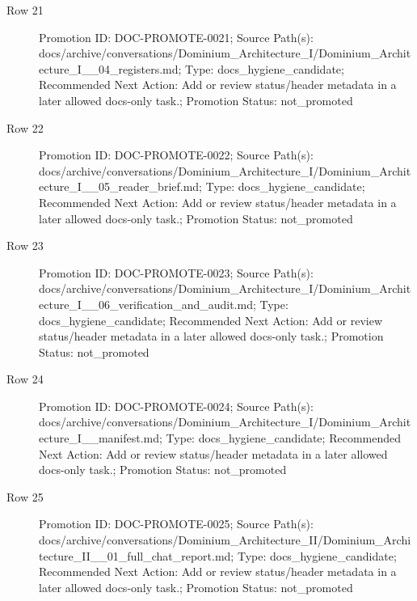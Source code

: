 \documentclass[10.5pt,a4paper,openany]{book}
\begin{document}
\begin{description}
\item[Row 21] Promotion ID: DOC-\allowbreak{}PROMOTE-\allowbreak{}0021; Source Path(s): docs/\allowbreak{}archive/\allowbreak{}conversations/\allowbreak{}Dominium\_\allowbreak{}Architecture\_\allowbreak{}I/\allowbreak{}Dominium\_\allowbreak{}Architecture\_\allowbreak{}I\_\allowbreak{}\_\allowbreak{}04\_\allowbreak{}registers.\allowbreak{}md; Type: docs\_\allowbreak{}hygiene\_\allowbreak{}candidate; Recommended Next Action: Add or review status/\allowbreak{}header metadata in a later allowed docs-\allowbreak{}only task.\allowbreak{}; Promotion Status: not\_\allowbreak{}promoted
\item[Row 22] Promotion ID: DOC-\allowbreak{}PROMOTE-\allowbreak{}0022; Source Path(s): docs/\allowbreak{}archive/\allowbreak{}conversations/\allowbreak{}Dominium\_\allowbreak{}Architecture\_\allowbreak{}I/\allowbreak{}Dominium\_\allowbreak{}Architecture\_\allowbreak{}I\_\allowbreak{}\_\allowbreak{}05\_\allowbreak{}reader\_\allowbreak{}brief.\allowbreak{}md; Type: docs\_\allowbreak{}hygiene\_\allowbreak{}candidate; Recommended Next Action: Add or review status/\allowbreak{}header metadata in a later allowed docs-\allowbreak{}only task.\allowbreak{}; Promotion Status: not\_\allowbreak{}promoted
\item[Row 23] Promotion ID: DOC-\allowbreak{}PROMOTE-\allowbreak{}0023; Source Path(s): docs/\allowbreak{}archive/\allowbreak{}conversations/\allowbreak{}Dominium\_\allowbreak{}Architecture\_\allowbreak{}I/\allowbreak{}Dominium\_\allowbreak{}Architecture\_\allowbreak{}I\_\allowbreak{}\_\allowbreak{}06\_\allowbreak{}verification\_\allowbreak{}and\_\allowbreak{}audit.\allowbreak{}md; Type: docs\_\allowbreak{}hygiene\_\allowbreak{}candidate; Recommended Next Action: Add or review status/\allowbreak{}header metadata in a later allowed docs-\allowbreak{}only task.\allowbreak{}; Promotion Status: not\_\allowbreak{}promoted
\item[Row 24] Promotion ID: DOC-\allowbreak{}PROMOTE-\allowbreak{}0024; Source Path(s): docs/\allowbreak{}archive/\allowbreak{}conversations/\allowbreak{}Dominium\_\allowbreak{}Architecture\_\allowbreak{}I/\allowbreak{}Dominium\_\allowbreak{}Architecture\_\allowbreak{}I\_\allowbreak{}\_\allowbreak{}manifest.\allowbreak{}md; Type: docs\_\allowbreak{}hygiene\_\allowbreak{}candidate; Recommended Next Action: Add or review status/\allowbreak{}header metadata in a later allowed docs-\allowbreak{}only task.\allowbreak{}; Promotion Status: not\_\allowbreak{}promoted
\item[Row 25] Promotion ID: DOC-\allowbreak{}PROMOTE-\allowbreak{}0025; Source Path(s): docs/\allowbreak{}archive/\allowbreak{}conversations/\allowbreak{}Dominium\_\allowbreak{}Architecture\_\allowbreak{}II/\allowbreak{}Dominium\_\allowbreak{}Architecture\_\allowbreak{}II\_\allowbreak{}\_\allowbreak{}01\_\allowbreak{}full\_\allowbreak{}chat\_\allowbreak{}report.\allowbreak{}md; Type: docs\_\allowbreak{}hygiene\_\allowbreak{}candidate; Recommended Next Action: Add or review status/\allowbreak{}header metadata in a later allowed docs-\allowbreak{}only task.\allowbreak{}; Promotion Status: not\_\allowbreak{}promoted

\end{description}
\end{document}
